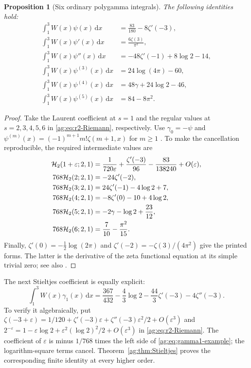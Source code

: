 \documentclass[11pt,letterpaper]{article}
\numberwithin{equation}{section}
\newtheorem{proposition}[theorem]{Proposition}
\theoremstyle{definition}\newtheorem{definition}[theorem]{Definition}
\theoremstyle{remark}\newtheorem{remark}[theorem]{Remark}
\newcommand{\dd}{\,\mathrm d}\newcommand{\ii}{\mathrm i}
\begin{document}
\begin{proposition}[Six ordinary polygamma integrals]
\label{ag:prop:six-integrals}
The following identities hold:
\begin{align}
 \int_1^3W(x)\psi(x)\dd x
   &=\frac{83}{180}-8\zeta'(-3),\label{ag:eq:Ipsi0}\\
 \int_1^3W(x)\psi'(x)\dd x
   &=\frac{6\zeta(3)}{\pi^2},\label{ag:eq:Ipsi1}\\
 \int_1^3W(x)\psi''(x)\dd x
   &=-48\zeta'(-1)+8\log2-14,\label{ag:eq:Ipsi2}\\
 \int_1^3W(x)\psi^{(3)}(x)\dd x
   &=24\log(4\pi)-60,\label{ag:eq:Ipsi3}\\
 \int_1^3W(x)\psi^{(4)}(x)\dd x
   &=48\gamma+24\log2-46,\label{ag:eq:Ipsi4}\\
 \int_1^3W(x)\psi^{(5)}(x)\dd x
   &=84-8\pi^2.\label{ag:eq:Ipsi5}
\end{align}
\end{proposition}
\begin{proof}
Take the Laurent coefficient at $s=1$ and the regular values at
$s=2,3,4,5,6$ in \eqref{ag:eq:r2-Riemann}, respectively. Use
$\gamma_0=-\psi$ and
$\psi^{(m)}(x)=(-1)^{m+1}m!\zeta(m+1,x)$ for $m\ge1$
\cite{DLMFpsi}. To make the cancellation reproducible, the required
intermediate values are
\begin{align*}
 \mathcal H_2(1+\varepsilon;2,1)
 &=\frac1{720\varepsilon}+\frac{\zeta'(-3)}{96}
                               -\frac{83}{138240}+O(\varepsilon),\\
 768\mathcal H_2(2;2,1)&=-24\zeta'(-2),\\
 768\mathcal H_2(3;2,1)&=24\zeta'(-1)-4\log2+7,\\
 768\mathcal H_2(4;2,1)&=-8\zeta'(0)-10+4\log2,\\
 768\mathcal H_2(5;2,1)&=-2\gamma-\log2+\frac{23}{12},\\
 768\mathcal H_2(6;2,1)&=\frac7{10}-\frac{\pi^2}{15}.
\end{align*}
Finally, $\zeta'(0)=-\tfrac12\log(2\pi)$ and
$\zeta'(-2)=-\zeta(3)/(4\pi^2)$ give the printed forms.
The latter is the derivative of the zeta functional equation at its
simple trivial zero; see also \cite{DLMFintegers}.
\end{proof}

The next Stieltjes coefficient is equally explicit:
\begin{equation}\label{ag:eq:gamma1-example}
 \boxed{
 \int_1^3W(x)\gamma_1(x)\dd x
 =\frac{367}{432}-\frac43\log2
                 -\frac{44}{3}\zeta'(-3)-4\zeta''(-3).}
\end{equation}
To verify it algebraically, put
$\zeta(-3+\varepsilon)=1/120+\zeta'(-3)\varepsilon+
\zeta''(-3)\varepsilon^2/2+O(\varepsilon^3)$ and
$2^{-\varepsilon}=1-\varepsilon\log2+
\varepsilon^2(\log2)^2/2+O(\varepsilon^3)$ in
\eqref{ag:eq:r2-Riemann}. The coefficient of $\varepsilon$ is minus
$1/768$ times the left side of \eqref{ag:eq:gamma1-example}; the
logarithm-square terms cancel. Theorem~\ref{ag:thm:Stieltjes} proves the
corresponding finite identity at every higher order.
\end{document}
